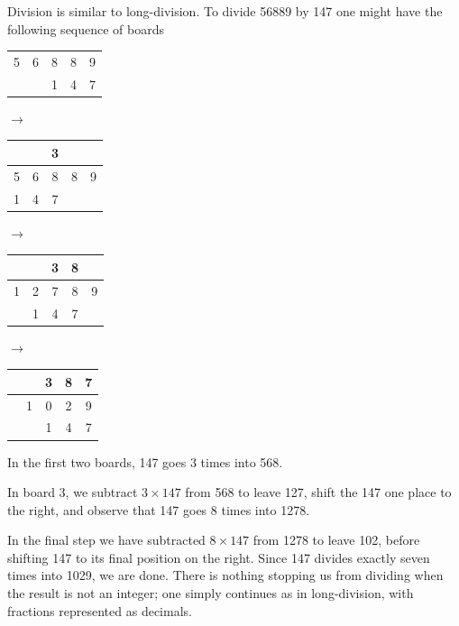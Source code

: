 Division is similar to long-division. To divide 56889 by 147 one might have the following sequence of boards
\begin{center}
  \begin{tabular}{|c|c|c|c|c|}
  \hline
  &&&&\\\hline
  5&6&8&8&9\\\hline
  &&1&4&7\\\hline
  \end{tabular} $\longrightarrow$
  \begin{tabular}{|c|c|c|c|c|}
  \hline
  &&3&&\\\hline
  5&6&8&8&9\\\hline
  1&4&7&&\\\hline
  \end{tabular}$\longrightarrow$
  \begin{tabular}{|c|c|c|c|c|}
  \hline
  &&3&8&\\\hline
  1&2&7&8&9\\\hline
  &1&4&7&\\\hline
  \end{tabular}$\longrightarrow$
  \begin{tabular}{|c|c|c|c|c|}
  \hline
  &&3&8&7\\\hline
  &1&0&2&9\\\hline
  &&1&4&7\\\hline
  \end{tabular}
\end{center}
In the first two boards, 147 goes 3 times into 568.\par
In board 3, we subtract $3\times 147$ from 568 to leave 127, shift the 147 one place to the right, and observe that 147 goes 8 times into 1278.\par
In the final step we have subtracted $8\times 147$ from 1278 to leave 102, before shifting 147 to its final position on the right. Since 147 divides exactly seven times into 1029, we are done.\smallbreak
There is nothing stopping us from dividing when the result is not an integer; one simply continues as in long-division, with fractions represented as decimals.
\goodbreak



